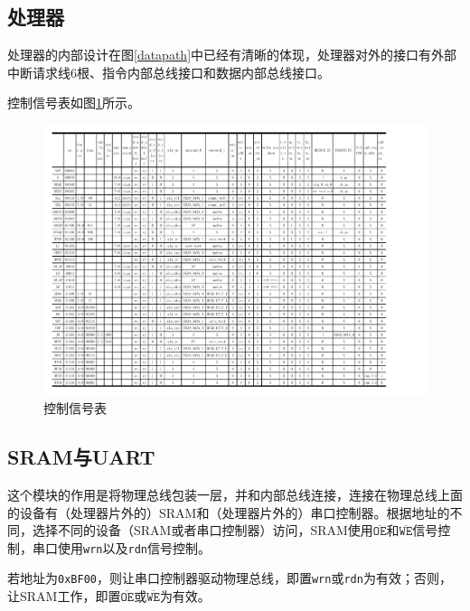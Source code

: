 \documentclass[11pt,utf8]{report}
\begin{document}
\subsection{处理器}
	\par 处理器的内部设计在图\ref{datapath}中已经有清晰的体现，处理器对外的接口有外部中断请求线6根、指令内部总线接口和数据内部总线接口。
	
	\par 控制信号表如图\ref{control}所示。	
	
	\begin{center}
	\begin{figure}[H]
			\centering
			\setlength{\leftskip}{-40pt}
			\includegraphics[width=1.2\textwidth]{control.pdf}
			\caption{控制信号表}
			\label{control}
		\end{figure}
	\end{center}

\subsection{SRAM与UART}
	\par 这个模块的作用是将物理总线包装一层，并和内部总线连接，连接在物理总线上面的设备有（处理器片外的）SRAM和（处理器片外的）串口控制器。根据地址的不同，选择不同的设备（SRAM或者串口控制器）访问，SRAM使用\texttt{$\mathtt{\overline{OE}}\mbox{和}\mathtt{\overline{WE}}$}信号控制，串口使用\texttt{wrn}以及\texttt{rdn}信号控制。
	\par 若地址为\texttt{0xBF00}，则让串口控制器驱动物理总线，即置\texttt{wrn}或\texttt{rdn}为有效；否则，让SRAM工作，即置\texttt{$\mathtt{\overline{OE}}\mbox{或}\mathtt{\overline{WE}}$}为有效。
	
\end{document}
